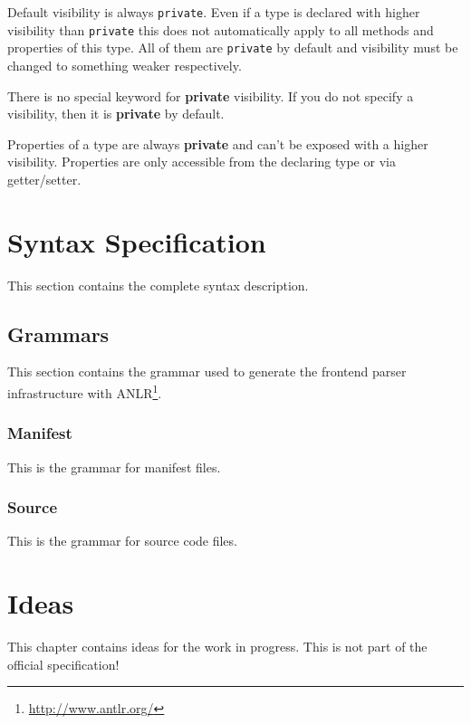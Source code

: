 \documentclass[11pt,a4paper]{report}
\begin{document}
Default visibility is always \texttt{private}. Even if a type is declared with higher visibility than \texttt{private} this does not automatically apply to all methods and properties of this type. All of them are \texttt{private} by default and visibility must be changed to something weaker respectively.

There is no special keyword for \textbf{private} visibility. If you do not specify a visibility, then it is \textbf{private} by default.

Properties of a type are always \textbf{private} and can't be exposed with a higher visibility. Properties are only accessible from the declaring type or via getter/setter.

\chapter{Syntax Specification}

This section contains the complete syntax description.

\section{Grammars}

This section contains the grammar used to generate the frontend parser infrastructure with ANLR\footnote{\url{http://www.antlr.org/}}.

\subsection{Manifest}

This is the grammar for manifest files.



\subsection{Source}

This is the grammar for source code files.



\chapter{Ideas}


This chapter contains ideas for the work in progress. This is not part of the official specification!
\end{document}
